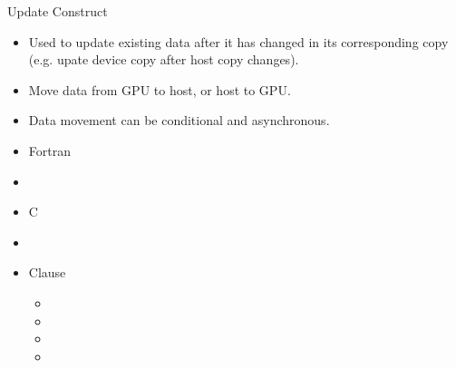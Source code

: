 \documentclass[10pt,t]{beamer}
\begin{document}
\begin{frame}[fragile]{Update Construct}
  \begin{itemize}
    \item Used to update existing data after it has changed in its corresponding copy (e.g. upate device copy after host copy changes).
    \item Move data from GPU to host, or host to GPU.
    \item Data movement can be conditional and asynchronous.
    \item Fortran
    \item[] 
    \item C
    \item[] 
    \item Clause
    \begin{itemize}
      \item {}
      \item {}
      \item {}
      \item {}
    \end{itemize}
  \end{itemize}
\end{frame}

%     
%     
\end{document}
